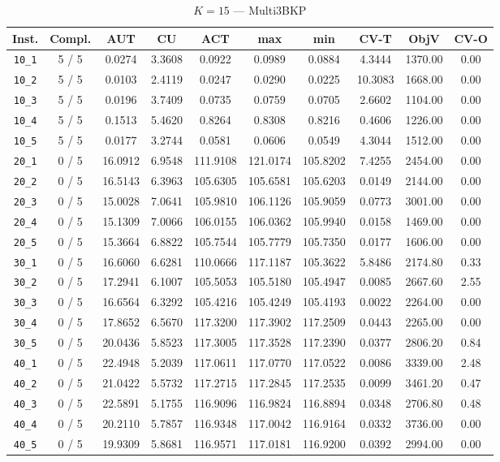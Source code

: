 \begin{table}[h!]
\begin{center}
\small
\begin{tabular}{| c | c | c | c | c | c | c | c | c | c |}
\hline
Inst. & Compl. & AUT & CU & ACT & max & min & CV-T & ObjV & CV-O \\
\hline
\verb|10_1| & 5 / 5 & 0.0274 & 3.3608 & 0.0922 & 0.0989 & 0.0884 & 4.3444 & 1370.00 & 0.00\\ 
\verb|10_2| & 5 / 5 & 0.0103 & 2.4119 & 0.0247 & 0.0290 & 0.0225 & 10.3083 & 1668.00 & 0.00\\ 
\verb|10_3| & 5 / 5 & 0.0196 & 3.7409 & 0.0735 & 0.0759 & 0.0705 & 2.6602 & 1104.00 & 0.00\\ 
\verb|10_4| & 5 / 5 & 0.1513 & 5.4620 & 0.8264 & 0.8308 & 0.8216 & 0.4606 & 1226.00 & 0.00\\ 
\verb|10_5| & 5 / 5 & 0.0177 & 3.2744 & 0.0581 & 0.0606 & 0.0549 & 4.3044 & 1512.00 & 0.00\\ 
\verb|20_1| & 0 / 5 & 16.0912 & 6.9548 & 111.9108 & 121.0174 & 105.8202 & 7.4255 & 2454.00 & 0.00\\ 
\verb|20_2| & 0 / 5 & 16.5143 & 6.3963 & 105.6305 & 105.6581 & 105.6203 & 0.0149 & 2144.00 & 0.00\\ 
\verb|20_3| & 0 / 5 & 15.0028 & 7.0641 & 105.9810 & 106.1126 & 105.9059 & 0.0773 & 3001.00 & 0.00\\ 
\verb|20_4| & 0 / 5 & 15.1309 & 7.0066 & 106.0155 & 106.0362 & 105.9940 & 0.0158 & 1469.00 & 0.00\\ 
\verb|20_5| & 0 / 5 & 15.3664 & 6.8822 & 105.7544 & 105.7779 & 105.7350 & 0.0177 & 1606.00 & 0.00\\ 
\verb|30_1| & 0 / 5 & 16.6060 & 6.6281 & 110.0666 & 117.1187 & 105.3622 & 5.8486 & 2174.80 & 0.33\\ 
\verb|30_2| & 0 / 5 & 17.2941 & 6.1007 & 105.5053 & 105.5180 & 105.4947 & 0.0085 & 2667.60 & 2.55\\ 
\verb|30_3| & 0 / 5 & 16.6564 & 6.3292 & 105.4216 & 105.4249 & 105.4193 & 0.0022 & 2264.00 & 0.00\\ 
\verb|30_4| & 0 / 5 & 17.8652 & 6.5670 & 117.3200 & 117.3902 & 117.2509 & 0.0443 & 2265.00 & 0.00\\ 
\verb|30_5| & 0 / 5 & 20.0436 & 5.8523 & 117.3005 & 117.3528 & 117.2390 & 0.0377 & 2806.20 & 0.84\\ 
\verb|40_1| & 0 / 5 & 22.4948 & 5.2039 & 117.0611 & 117.0770 & 117.0522 & 0.0086 & 3339.00 & 2.48\\ 
\verb|40_2| & 0 / 5 & 21.0422 & 5.5732 & 117.2715 & 117.2845 & 117.2535 & 0.0099 & 3461.20 & 0.47\\ 
\verb|40_3| & 0 / 5 & 22.5891 & 5.1755 & 116.9096 & 116.9824 & 116.8894 & 0.0348 & 2706.80 & 0.48\\ 
\verb|40_4| & 0 / 5 & 20.2110 & 5.7857 & 116.9348 & 117.0042 & 116.9164 & 0.0332 & 3736.00 & 0.00\\ 
\verb|40_5| & 0 / 5 & 19.9309 & 5.8681 & 116.9571 & 117.0181 & 116.9200 & 0.0392 & 2994.00 & 0.00\\ 
\hline
\end{tabular}
\caption{$K = 15$ --- Multi3BKP}
\label{table:multi:15}
\end{center}
\end{table}


